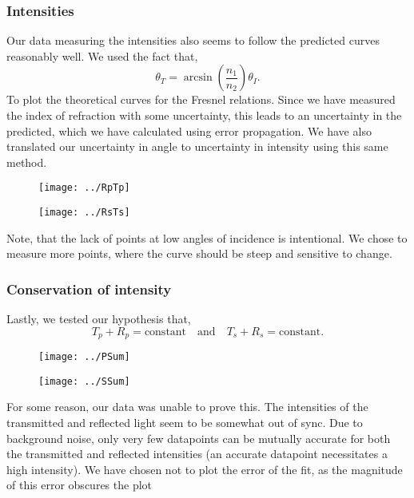 \documentclass[working]{inputs/tuftebook}
\begin{document}
\subsubsection{Intensities}
Our data measuring the intensities also seems to follow the predicted curves reasonably well. We used the fact that,
\[
\theta_T = \arcsin \left( \frac{n_1}{n_2} \right) \theta_I
.\] 
To plot the theoretical curves for the Fresnel relations. Since we have measured the index of refraction with some uncertainty, this leads to an uncertainty in the predicted, which we have calculated using error propagation. We have also translated our uncertainty in angle to uncertainty in intensity using this same method. 
\begin{figure}[h]
	\centering
	\texttt{[image: ../RpTp]}
\end{figure}
\begin{figure}[h]
	\centering
	\texttt{[image: ../RsTs]}
\end{figure}
Note, that the lack of points at low angles of incidence is intentional. We chose to measure more points, where the curve should be steep and sensitive to change. 
\subsubsection{Conservation of intensity}
Lastly, we tested our hypothesis that,
\[
T_p + R_p = \text{constant} \quad \text{and} \quad T_s + R_s = \text{constant}
.\]
\begin{figure}[H]
	\centering
	\texttt{[image: ../PSum]}
\end{figure}
\begin{figure}[H]
	\centering
	\texttt{[image: ../SSum]}
\end{figure}
For some reason, our data was unable to prove this. The intensities of the transmitted and reflected light seem to be somewhat out of sync. Due to background noise, only very few datapoints can be mutually accurate for both the transmitted and reflected intensities (an accurate datapoint necessitates a high intensity). We have chosen not to plot the error of the fit, as the magnitude of this error obscures the plot 
\newpage
\end{document}
